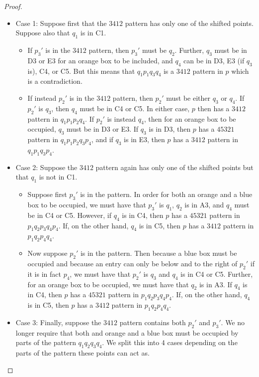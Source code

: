 \documentclass[11pt]{amsart}
\theoremstyle{remark}
\numberwithin{equation}{section}
\begin{document}
\begin{proof}
    \begin{itemize}
        \item Case 1: Suppose first that the $3412$ pattern has only one of the shifted points. Suppose also that $q_1$ is in C1.
        \begin{itemize}
            \item If $p_3'$ is in the $3412$ pattern, then $p_3'$ must be $q_2$. Further, $q_3$ must be in D3 or E3 for an orange box to be included, and $q_4$ can be in D3, E3 (if $q_3$ is), C4, or C5. But this means that $q_1p_1q_3q_4$ is a $3412$ pattern in $p$ which is a contradiction. 
            \item If instead $p_2'$ is in the $3412$ pattern, then $p_2'$ must be either $q_3$ or $q_4$. If $p_2'$ is $q_3$, then $q_4$ must be in C4 or C5. In either case, $p$ then has a $3412$ pattern in $q_1p_1p_2q_4$. If $p_2'$ is instead $q_4$, then for an orange box to be occupied, $q_3$ must be in D3 or E3. If $q_3$ is in D3, then $p$ has a $45321$ pattern in $q_1p_1p_2q_3p_4$, and if $q_3$ is in E3, then $p$ has a $3412$ pattern in $q_1p_1q_3p_4$. 
        \end{itemize}
        \item Case 2: Suppose the $3412$ pattern again has only one of the shifted points but that $q_1$ is not in C1. 
        \begin{itemize}
            \item Suppose first $p_3'$ is in the pattern. In order for both an orange and a blue box to be occupied, we must have that $p_3'$ is $q_1$, $q_2$ is in A3, and $q_4$ must be in C4 or C5. However, if $q_4$ is in C4, then $p$ has a $45321$ pattern in $p_1q_2p_3q_4p_4$. If, on the other hand, $q_4$ is in C5, then $p$ has a $3412$ pattern in $p_1q_2p_4q_4$. 
            \item Now suppose $p_2'$ is in the pattern. Then because a blue box must be occupied and because an entry can only be below and to the right of $p_2'$ if it is in fact $p_4$, we must have that $p_2'$ is $q_3$ and $q_4$ is in C4 or C5. Further, for an orange box to be occupied, we must have that $q_2$ is in A3. If $q_4$ is in C4, then $p$ has a $45321$ pattern in $p_1q_2p_3q_4p_4$. If, on the other hand, $q_4$ is in C5, then $p$ has a $3412$ pattern in $p_1q_2p_4q_4$.
        \end{itemize}
        \item Case 3: Finally, suppose the $3412$ pattern contains both $p_2'$ and $p_3'$. We no longer require that both and orange and a blue box must be occupied by parts of the pattern $q_1q_2q_3q_4$. We split this into 4 cases depending on the parts of the pattern these points can act as.

\end{itemize}
\end{proof}
\end{document}
